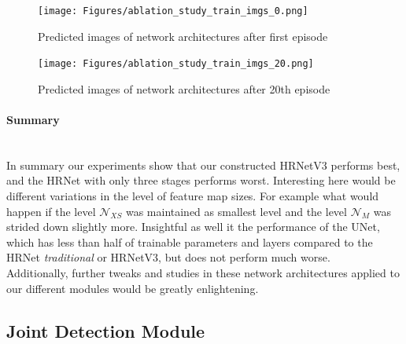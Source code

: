 \begin{figure}[H]
    \centering
    \texttt{[image: Figures/ablation\_study\_train\_imgs\_0.png]}
    \decoRule
    \caption[Ablation Human Parts Module: 1st Episode Predictions]{Predicted images of network architectures after first
    episode}
    \label{fig:train-img-0}
\end{figure}
\begin{figure}[H]
    \centering
    \texttt{[image: Figures/ablation\_study\_train\_imgs\_20.png]}
    \decoRule
    \caption[Ablation Human Parts Module: 20th Episode Predictions]{Predicted images of network architectures after 20th
    episode}
    \label{fig:train-img-20}
\end{figure}

\paragraph{Summary}\mbox{}\\
In summary our experiments show that our constructed HRNetV3 performs best, and the HRNet with only three stages performs
worst.
Interesting here would be different variations in the level of feature map sizes.
For example what would happen if the level $\mathcal{N}_{XS}$ was maintained as smallest level and the level
$\mathcal{N}_M$ was strided down slightly more.
Insightful as well it the performance of the UNet, which has less than half of trainable parameters and layers compared to
the HRNet \textit{traditional} or HRNetV3, but does not perform much worse.\\
Additionally, further tweaks and studies in these network architectures applied to our different modules would be
greatly enlightening.


\subsection{Joint Detection Module }

